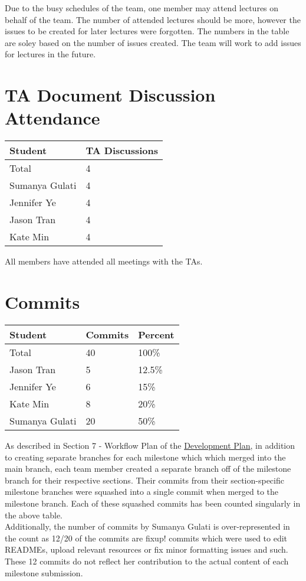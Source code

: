 \documentclass{article}
\begin{document}
Due to the busy schedules of the team, one member may attend lectures on behalf
of the team. The number of attended lectures should be more, however the issues
to be created for later lectures were forgotten. The numbers in the table are soley
based on the number of issues created. The team will work to add
issues for lectures in the future. 

\section{TA Document Discussion Attendance}

\begin{table}[H]
\centering
\begin{tabular}{ll}
\toprule
\textbf{Student} & \textbf{TA Discussions}\\
\midrule
Total & 4\\
Sumanya Gulati & 4\\
Jennifer Ye & 4\\
Jason Tran & 4\\
Kate Min & 4\\
\bottomrule
\end{tabular}
\end{table}

All members have attended all meetings with the TAs.

\section{Commits}

\begin{table}[H]
\centering
\begin{tabular}{lll}
\toprule
\textbf{Student} & \textbf{Commits} & \textbf{Percent}\\
\midrule
Total & 40 & 100\% \\
Jason Tran & 5 & 12.5\% \\
Jennifer Ye & 6 & 15\% \\
Kate Min & 8 & 20\% \\
Sumanya Gulati & 20 & 50\% \\
\bottomrule
\end{tabular}
\end{table}

As described in Section 7 - Workflow Plan of the 
\href{https://github.com/SumanyaG/Alkalytics/blob/main/docs/DevelopmentPlan/DevelopmentPlan.pdf}{Development Plan},
in addition to creating separate branches for each milestone which which merged into the main
branch, each team member created a separate branch off of the milestone branch for their 
respective sections. Their commits from their section-specific milestone branches were squashed
into a single commit when merged to the milestone branch. Each of these squashed commits has been counted
singularly in the above table.\\
\newline
Additionally, the number of commits by Sumanya Gulati is over-represented in the count as 12/20 of the
commits are fixup! commits which were used to edit READMEs, upload relevant resources or fix minor 
formatting issues and such. These 12 commits do not reflect her contribution to the actual content of 
each milestone submission.
\end{document}
